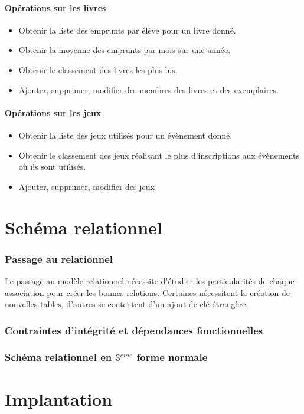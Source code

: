 \documentclass[a4paper, 11pt]{article}
\begin{document}
\subsection{Opérations sur les livres}
\begin{itemize}
\item Obtenir la liste des emprunts par élève pour un livre donné.
\item Obtenir la moyenne des emprunts par mois sur une année.
\item Obtenir le classement des livres les plus lus.
\item Ajouter, supprimer, modifier des membres des livres et des exemplaires.
\end{itemize}
\subsection{Opérations sur les jeux}
\begin{itemize}
\item Obtenir la liste des jeux utilisés pour un évènement donné.
\item Obtenir le classement des jeux réalisant le plus d'inscriptions aux évènements où ils sont utilisés.
\item Ajouter, supprimer, modifier des jeux
\end{itemize}
\newpage
\part{Schéma relationnel}
\setcounter{section}{0}
\section{Passage au relationnel}
Le passage au modèle relationnel nécessite d'étudier les particularités de chaque association pour créer les bonnes relations. Certaines nécessitent la création de nouvelles tables, d'autres se contentent d'un ajout de clé étrangère.
\section{Contraintes d'intégrité et dépendances fonctionnelles}
\section{Schéma relationnel en $3^{eme}$ forme normale}
\newpage
\part{Implantation}
\setcounter{section}{0}
\end{document}
